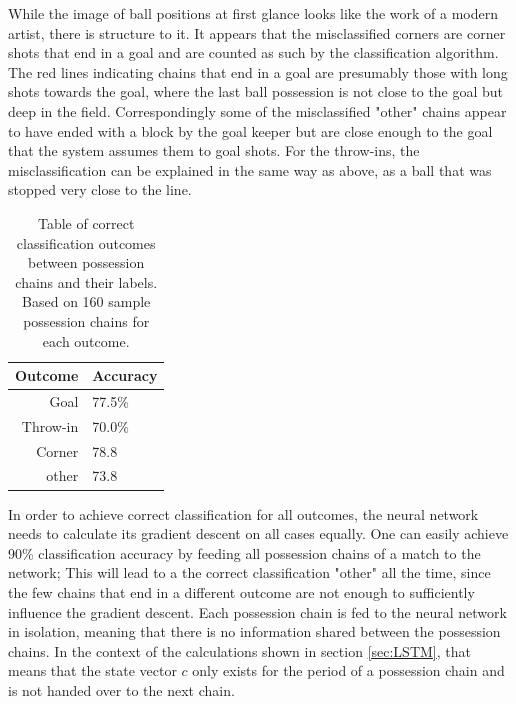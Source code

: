 \documentclass[10pt, a4paper]{UUThesisTemplate}
\begin{document}
While the image of ball positions at first glance looks like the work of a modern artist, there is structure to it. It appears that the misclassified corners are corner shots that end in a goal and are counted as such by the classification algorithm. The red lines indicating chains that end in a goal are presumably those with long shots towards the goal, where the last ball possession is not close to the goal but deep in the field. Correspondingly some of the misclassified "other" chains appear to have ended with a block by the goal keeper but are close enough to the goal that the system assumes them to goal shots. For the throw-ins, the misclassification can be explained in the same way as above, as a ball that was stopped very close to the line.

\begin{table}\centering\small
\begin{tabular}{rl}
Outcome & Accuracy\\\hline
Goal & 77.5\%\\
Throw-in & 70.0\%\\
Corner & 78.8\\
other & 73.8\\\hline
\end{tabular}
\caption{Table of correct classification outcomes between possession chains and their labels. Based on 160 sample possession chains for each outcome.}\label{tab:possclass}
\end{table}

In order to achieve correct classification for all outcomes, the neural network needs to calculate its gradient descent on all cases equally. One can easily achieve 90\% classification accuracy by feeding all possession chains of a match to the network; This will lead to a the correct classification "other" all the time, since the few chains that end in a different outcome are not enough to sufficiently influence the gradient descent. Each possession chain is fed to the neural network in isolation, meaning that there is no information shared between the possession chains. In the context of the calculations shown in section \ref{sec:LSTM}, that means that the state vector $c$ only exists for the period of a possession chain and is not handed over to the next chain.
\end{document}
